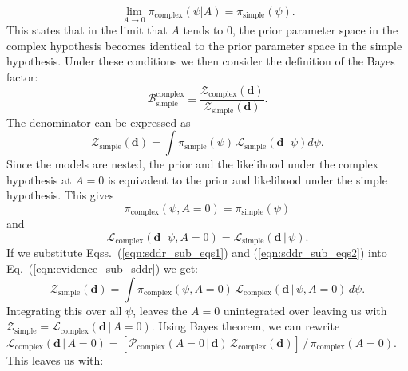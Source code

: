 \begin{equation}\label{eqn:sddr_condition}
    \lim_{A \to 0} \pi_{\mathrm{complex}} \left(\psi | A\right) = \pi_{\mathrm{simple}}\left(\psi\right).
\end{equation}
This states that in the limit that $A$ tends to $0$, the prior parameter space in the complex hypothesis becomes identical to the prior parameter space in the simple hypothesis. Under these conditions we then consider the definition of the Bayes factor:
\begin{equation}
    \mathcal{B}^{\mathrm{complex}}_{\mathrm{simple}} \equiv \frac{\mathcal{Z}_{\mathrm{complex}}(\mathbf{d})}{\mathcal{Z}_{\mathrm{simple}}(\mathbf{d})}.
\end{equation}
The denominator can be expressed as
\begin{equation}\label{eqn:evidence_sub_sddr}
    \mathcal{Z}_{\mathrm{simple}}(\mathbf{d}) = \int \pi_{\mathrm{simple}}\left(\psi\right) \, \mathcal{L}_{\mathrm{simple}} \left(\mathbf{d} \, | \, \psi \right)  d\psi.
\end{equation}
Since the models are nested, the prior and the likelihood under the complex hypothesis at $A=0$ is equivalent to the prior and likelihood under the simple hypothesis. This gives
\begin{equation}\label{eqn:sddr_sub_eqs1}
   \pi_{\mathrm{complex}}\left(\psi, A=0\right) = \pi_{\mathrm{simple}}\left(\psi \right)
\end{equation}
and
\begin{equation}\label{eqn:sddr_sub_eqs2}
    \mathcal{L}_{\mathrm{complex}}\left(\mathbf{d} \, | \, \psi, A=0\right) = \mathcal{L}_{\mathrm{simple}}\left( \mathbf{d} \, | \, \psi \right).
\end{equation}
If we substitute Eqss.~(\ref{eqn:sddr_sub_eqs1}) and (\ref{eqn:sddr_sub_eqs2}) into Eq.~(\ref{eqn:evidence_sub_sddr}) we get:
\begin{equation}
    \mathcal{Z}_{\mathrm{simple}}(\mathbf{d}) = \int \pi_{\mathrm{complex}}\left(\psi, A=0\right) \, \mathcal{L}_{\mathrm{complex}} \left(\mathbf{d} \, | \, \psi, A=0 \right)\,  d\psi.
\end{equation}
Integrating this over all $\psi$, leaves the $A=0$ unintegrated over leaving us with $\mathcal{Z}_{\mathrm{simple}} = \mathcal{L}_{\mathrm{complex}} \left(\mathbf{d} \, | \, A=0 \right)$. Using Bayes theorem, we can rewrite $\mathcal{L}_{\mathrm{complex}} \left(\mathbf{d} \, | \, A=0 \right) = [\mathcal{P}_{\mathrm{complex}}(A=0 \, | \, \mathbf{d}) \, \mathcal{Z}_{\mathrm{complex}}(\mathbf{d})] \, / \, \pi_{\mathrm{complex}} (A=0)$. This leaves us with:

